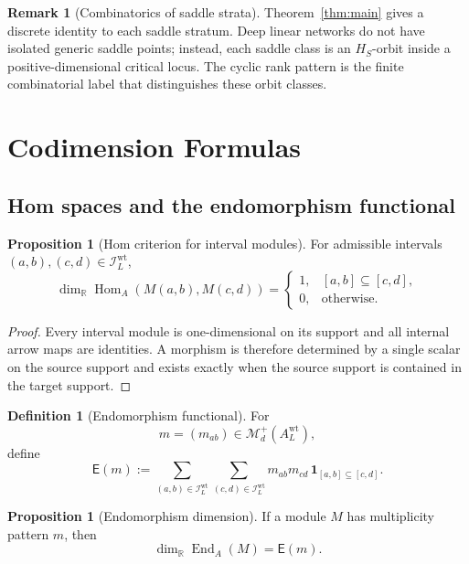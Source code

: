\documentclass[11pt]{article}
\newcommand{\Hom}{\operatorname{Hom}}
\newcommand{\End}{\operatorname{End}}
\newcommand{\R}{\mathbb{R}}
\theoremstyle{definition}
\newtheorem{proposition}[theorem]{Proposition}
\newtheorem{definition}[theorem]{Definition}
\newtheorem{remark}[theorem]{Remark}
\begin{document}
\begin{remark}[Combinatorics of saddle strata]
Theorem~\ref{thm:main} gives a discrete identity to each saddle stratum. Deep
linear networks do not have isolated generic saddle points; instead, each saddle
class is an \(H_S\)-orbit inside a positive-dimensional critical locus. The
cyclic rank pattern is the finite combinatorial label that distinguishes these
orbit classes.
\end{remark}

\section{Codimension Formulas}

\subsection{Hom spaces and the endomorphism functional}

\begin{proposition}[Hom criterion for interval modules]
\label{prop:hom-criterion}
For admissible intervals \((a,b),(c,d)\in \mathcal I_L^{\mathrm{wt}}\),
\[
\dim_\R \Hom_A(M(a,b),M(c,d))
=
\begin{cases}
1, & [a,b]\subseteq [c,d],\\
0, & \text{otherwise}.
\end{cases}
\]
\end{proposition}

\begin{proof}
Every interval module is one-dimensional on its support and all internal arrow
maps are identities. A morphism is therefore determined by a single scalar on
the source support and exists exactly when the source support is contained in the
target support.
\end{proof}

\begin{definition}[Endomorphism functional]
For
\[
m=(m_{ab})\in \mathcal M_d^+(A_L^{\mathrm{wt}}),
\]
define
\[
\mathsf E(m)
:=
\sum_{(a,b)\in \mathcal I_L^{\mathrm{wt}}}
\sum_{(c,d)\in \mathcal I_L^{\mathrm{wt}}}
m_{ab}m_{cd}\,\mathbf 1_{[a,b]\subseteq [c,d]}.
\]
\end{definition}

\begin{proposition}[Endomorphism dimension]
\label{prop:end-dim}
If a module \(M\) has multiplicity pattern \(m\), then
\[
\dim_\R \End_A(M)=\mathsf E(m).
\]
\end{proposition}
\end{document}
